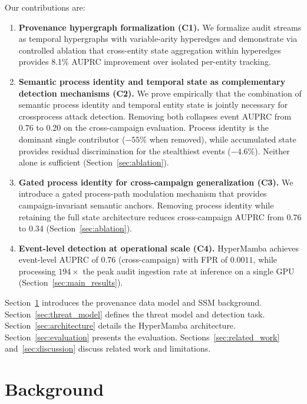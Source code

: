 \documentclass[letterpaper,twocolumn,10pt]{article}
\begin{document}
Our contributions are:
\begin{enumerate}
    \item \textbf{Provenance hypergraph formalization (C1).} We formalize audit streams as temporal hypergraphs with variable-arity hyperedges and demonstrate via controlled ablation that cross-entity state aggregation within hyperedges provides 8.1\% AUPRC improvement over isolated per-entity tracking.

    \item \textbf{Semantic process identity and temporal state as complementary detection mechanisms (C2).} We prove empirically that the combination of semantic process identity and temporal entity state is jointly necessary for crossprocess attack detection. Removing both collapses event AUPRC from 0.76 to 0.20 on the cross-campaign evaluation. Process identity is the dominant single contributor ($-55\%$ when removed), while accumulated state provides residual discrimination for the stealthiest events ($-4.6\%$). Neither alone is sufficient (Section~\ref{sec:ablation}).

    \item \textbf{Gated process identity for cross-campaign generalization (C3).} We introduce a gated process-path modulation mechanism that provides campaign-invariant semantic anchors. Removing process identity while retaining the full state architecture reduces cross-campaign AUPRC from 0.76 to 0.34 (Section~\ref{sec:ablation}).

    \item \textbf{Event-level detection at operational scale (C4).} HyperMamba achieves event-level AUPRC of 0.76 (cross-campaign) with FPR of $0.0011$, while processing $194\times$ the peak audit ingestion rate at inference on a single GPU (Section~\ref{sec:main_results}).
\end{enumerate}

Section~\ref{sec:background} introduces the provenance data model and SSM background. Section~\ref{sec:threat_model} defines the threat model and detection task. Section~\ref{sec:architecture} details the HyperMamba architecture. Section~\ref{sec:evaluation} presents the evaluation. Sections~\ref{sec:related_work} and~\ref{sec:discussion} discuss related work and limitations.

\section{Background}
\label{sec:background}
\end{document}
